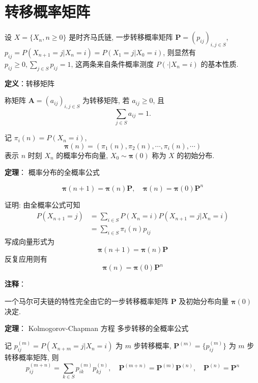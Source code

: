 \documentclass[openany]{ctexbook}
\theoremstyle{kaiti}
\theoremstyle{normal}
\begin{document}
\section{转移概率矩阵}

设 $X=\{X_n,n\geqslant0\}$ 是时齐马氏链, 一步转移概率矩阵 $\bm{P}=(p_{ij})_{i,j\in S}$, $p_{ij}=P(X_{n+1}=j|X_n=i)=P(X_1=j|X_0=i)$, 则显然有 $p_{ij}\geqslant0,\sum_{j\in S}p_{ij}=1$, 这两条来自条件概率测度 $P(\cdot|X_n=i)$ 的基本性质.

\textbf{定义}：转移矩阵

称矩阵 $\bm{A}=(a_{ij})_{i,j\in S}$ 为转移矩阵, 若 $a_{ij}\geqslant0$, 且
\begin{equation}
  \sum_{j\in S}a_{ij}=1.
\end{equation}


记 $\pi_i(n)=P(X_n=i)$,
\begin{equation}
  \bm{\pi}(n)=(\pi_1(n),\pi_2(n),\cdots,\pi_i(n),\cdots)
\end{equation}
表示 $n$ 时刻 $X_n$ 的概率分布向量, $X_0\sim\bm{\pi}(0)$ 称为 $X$ 的初始分布.

\textbf{定理}： 概率分布的全概率公式

\begin{equation}\bm{\pi}(n+1)=\bm{\pi}(n)\bm{P},\quad \bm{\pi}(n)=\bm{\pi}(0)\bm{P}^n\end{equation}

证明: 由全概率公式可知
\begin{equation}
  \begin{aligned}
    P(X_{n+1}=j)&=\sum_{i\in S}P(X_n=i)P(X_{n+1}=j|X_n=i)\\
    &=\sum_{i\in S} \pi_i(n)p_{ij}
  \end{aligned}
\end{equation} 写成向量形式为
\begin{equation}
  \bm{\pi}(n+1)=\bm{\pi}(n)\bm{P}
\end{equation} 反复应用则有
\begin{equation}
  \bm{\pi}(n)=\bm{\pi}(0)\bm{P}^n
\end{equation}

\textbf{注释}：

一个马尔可夫链的特性完全由它的一步转移概率矩阵 $\bm{P}$ 及初始分布向量 $\bm{\pi}(0)$ 决定.

\textbf{定理}： Kolmogorov-Chapman 方程 多步转移的全概率公式

记 $p_{ij}^{(m)}=P(X_{n+m}=j|X_n=i)$ 为 $m$ 步转移概率, $\bm{P}^{(m)}=\{p_{ij}^{(m)}\}$ 为 $m$ 步转移概率矩阵, 则 
\begin{equation}
  p_{ij}^{(m+n)}=\sum_{k\in S}p_{ik}^{(m)}p_{kj}^{(n)},\quad \bm{P}^{(m+n)}=\bm{P}^{(m)}\bm{P}^{(n)},\quad \bm{P}^{(n)}=\bm{P}^n
\end{equation}
\end{document}

